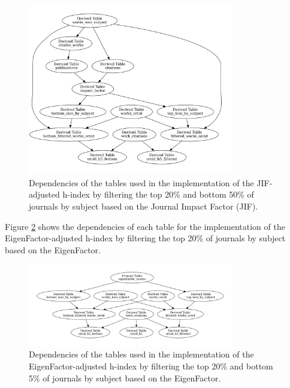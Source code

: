 \begin{figure}[H]
      \centering
      \includegraphics[width=0.8\textwidth]{../figs/impact.pdf}
      \caption{Dependencies of the tables used in the implementation of the JIF-adjusted h-index by filtering the top 20\% and bottom 50\% of journals by subject based on the Journal Impact Factor (JIF).}
      \label{fig:tables2}
\end{figure}

Figure \ref{fig:tables3} shows the dependencies of each table for the
implementation of the EigenFactor-adjusted h-index by filtering the top 20\% of
journals by subject based on the EigenFactor.

\begin{figure}[H]
      \centering
      \includegraphics[width=0.8\textwidth]{../figs/eigenfactor.pdf}
      \caption{Dependencies of the tables used in the implementation of the EigenFactor-adjusted h-index by filtering the top 20\% and bottom 5\% of journals by subject based on the EigenFactor.}
      \label{fig:tables3}
\end{figure}


